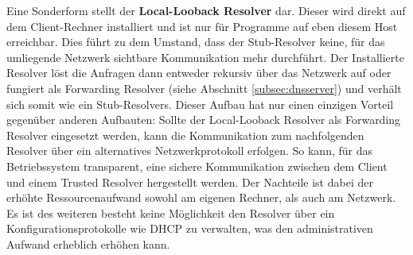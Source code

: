 Eine Sonderform stellt der \textbf{Local-Looback Resolver} dar. Dieser wird direkt auf dem Client-Rechner installiert und ist nur für Programme auf eben diesem Host erreichbar. Dies führt zu dem Umstand, dass der Stub-Resolver keine, für das umliegende Netzwerk sichtbare Kommunikation mehr durchführt. Der Installierte Resolver löst die Anfragen dann entweder rekursiv über das Netzwerk auf oder fungiert als Forwarding Resolver (siehe Abschnitt \ref{subsec:dnsserver}) und verhält sich somit wie ein Stub-Resolvers. Dieser Aufbau hat nur einen einzigen Vorteil gegenüber anderen Aufbauten: Sollte der Local-Looback Resolver als Forwarding Resolver eingesetzt werden, kann die Kommunikation zum nachfolgenden Resolver über ein alternatives Netzwerkprotokoll erfolgen. So kann, für das Betriebssystem transparent, eine sichere Kommunikation zwischen dem Client und einem Trusted Resolver hergestellt werden. Der Nachteile ist dabei der erhöhte Ressourcenaufwand sowohl am eigenen Rechner, als auch am Netzwerk. Es ist des weiteren besteht keine Möglichkeit den Resolver über ein Konfigurationsprotokolle wie DHCP zu verwalten, was den administrativen Aufwand erheblich erhöhen kann. 




